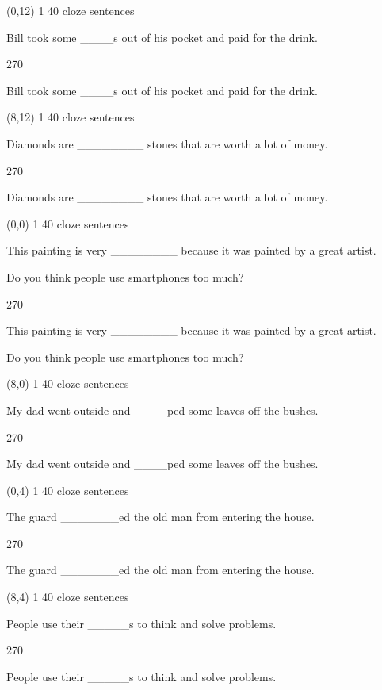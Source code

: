 \documentclass[a4paper]{article}
\newenvironment{itemize*}%
{\begin{itemize}%
 \setlength{\itemsep}{0.5cm}%
 \setlength{\parsep}{0pt}%
 \setlength{\parskip}{0pt}}%
{\end{itemize}}
\newcommand{\mycard}[3]{%
	\small #1 #2
	\par
	\parbox[t][6.8cm][c]{9.5cm}{%
	\par
	\myleft{#3}
	\par
	\myright{#3}
	}
}
\newcommand{\myleft}[1]{%
	\begin{sideways}
	\hspace*{-0.9cm}
		\parbox[t][2.7cm][t]{6.5cm}{%
		\large #1
		}
	\end{sideways}
}
\newcommand{\myright}[1]{%
	\hspace*{6.5cm}
	\begin{turn}{270}
	\hspace*{-7.1cm}
		\parbox[t][2.7cm][t]{6.5cm}{%
		\large #1
		}
	\end{turn}
}
\begin{document}
\begin{textblock}{8}(0,12)
\mycard{1}{40 cloze sentences}{
\begin{itemize*}
\item Bill took some \_\_\_\_s out of his pocket and paid for the drink.
\end{itemize*}
}
\end{textblock}

\begin{textblock}{8}(8,12)
\mycard{1}{40 cloze sentences}{
\begin{itemize*}
\item Diamonds are \_\_\_\_\_\_\_\_ stones that are worth a lot of money.
\end{itemize*}
}
\end{textblock}

\null
\newpage

\begin{textblock}{8}(0,0)
\mycard{1}{40 cloze sentences}{
\begin{itemize*}
\item This painting is very \_\_\_\_\_\_\_\_ because it was painted by a great artist.
\item Do you think people use smartphones too much?
\end{itemize*}
}
\end{textblock}

\begin{textblock}{8}(8,0)
\mycard{1}{40 cloze sentences}{
\begin{itemize*}
\item My dad went outside and \_\_\_\_ped some leaves off the bushes.
\end{itemize*}
}
\end{textblock}

\begin{textblock}{8}(0,4)
\mycard{1}{40 cloze sentences}{
\begin{itemize*}
\item The guard \_\_\_\_\_\_\_ed the old man from entering the house.
\end{itemize*}
}
\end{textblock}

\begin{textblock}{8}(8,4)
\mycard{1}{40 cloze sentences}{
\begin{itemize*}
\item People use their \_\_\_\_\_s to think and solve problems.
\end{itemize*}
}
\end{textblock}
\end{document}
